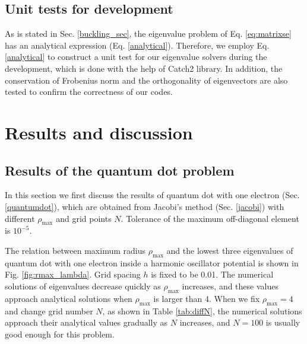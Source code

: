 \documentclass{article}
\begin{document}
	
	\subsection{Unit tests for development}\label{unittests}
As is stated in Sec. \ref{buckling_sec}, the eigenvalue problem of Eq. \ref{eq:matrixse} 
has an analytical expression (Eq. \ref{analytical}). 
Therefore, we employ Eq. \ref{analytical} to construct a unit test for our eigenvalue solvers during the development, 
which is done with the help of Catch2 library. 
In addition, the conservation of Frobenius norm and the orthogonality of eigenvectors are also tested 
to confirm the correctness of our codes. 
	
	\section{Results and discussion}\label{results}
	\subsection{Results of the quantum dot problem}
In this section we first discuss the results of quantum dot with one electron (Sec. \ref{quantumdot}), 
which are obtained from Jacobi's method (Sec. \ref{jacobi}) with different $\rho_{\max}$ and grid points $N$. 
Tolerance of the maximum off-diagonal element is $10^{-5}$. 
\par
The relation between maximum radius $\rho_{\max}$ and the lowest three eigenvalues of quantum dot with one electron inside a harmonic oscillator potential is shown in Fig. \ref{fig:rmax_lambda}. 
Grid spacing $h$ is fixed to be 0.01. 
The numerical solutions of eigenvalues decrease quickly as $\rho_{\max}$ increases, 
and these values approach analytical solutions when $\rho_{\max}$ is larger than 4. 
When we fix $\rho_{\max}=4$ and change grid number $N$, as shown in Table \ref{tab:diffN}, 
the numerical solutions approach their analytical values gradually as $N$ increases, 
and $N=100$ is usually good enough for this problem.  
\end{document}
